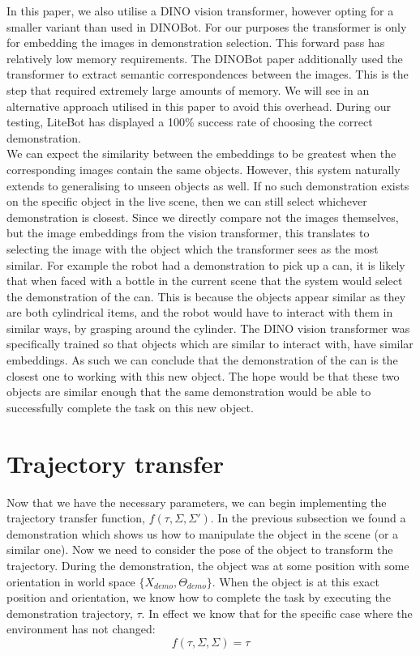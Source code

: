 In this paper, we also utilise a DINO vision transformer, however opting for a smaller variant than used in DINOBot. For our purposes the transformer is only for embedding the images in demonstration selection. This forward pass has relatively low memory requirements. The DINOBot paper additionally used the transformer to extract semantic correspondences between the images. This is the step that required extremely large amounts of memory. We will see in  an alternative approach utilised in this paper to avoid this overhead. During our testing, LiteBot has displayed a 100\% success rate of choosing the correct demonstration.\\

We can expect the similarity between the embeddings to be greatest when the corresponding images contain the same objects. However, this system naturally extends to generalising to unseen objects as well. If no such demonstration exists on the specific object in the live scene, then we can still select whichever demonstration is closest. Since we directly compare not the images themselves, but the image embeddings from the vision transformer, this translates to selecting the image with the object which the transformer sees as the most similar. For example the robot had a demonstration to pick up a can, it is likely that when faced with a bottle in the current scene that the system would select the demonstration of the can. This is because the objects appear similar as they are both cylindrical items, and the robot would have to interact with them in similar ways, by grasping around the cylinder. The DINO vision transformer was specifically trained so that objects which are similar to interact with, have similar embeddings. As such we can conclude that the demonstration of the can is the closest one to working with this new object. The hope would be that these two objects are similar enough that the same demonstration would be able to successfully complete the task on this new object.


\section{Trajectory transfer}
\label{sec:alignment}
Now that we have the necessary parameters, we can begin implementing the trajectory transfer function, $f(\tau, \Sigma, \Sigma')$. In the previous subsection we found a demonstration which shows us how to manipulate the object in the scene (or a similar one). Now we need to consider the pose of the object to transform the trajectory. During the demonstration, the object was at some position with some orientation in world space $\{X_{demo}, \Theta_{demo}\}$. When the object is at this exact position and orientation, we know how to complete the task by executing the demonstration trajectory, $\tau$. In effect we know that for the specific case where the environment has not changed:
$$f(\tau, \Sigma, \Sigma) = \tau$$

